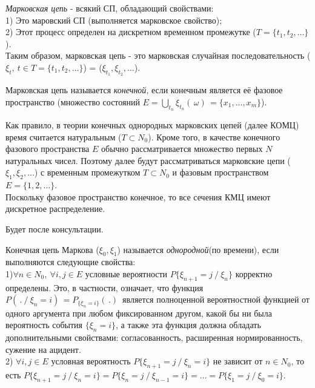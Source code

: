 \begin{defs}
  \textit{Марковская цепь} - всякий СП, обладающий свойствами:\\
  1) Это маровский СП (выполняется марковское свойство); \\
  2) Этот процесс определен на дискретном временном промежутке ($T = \{t_1, t_2, \ldots\}$).\\
  Таким образом, марковская цепь - это марковская случайная последовательность ($\xi_t, \ t \in T = \{t_1, t_2, \ldots\}$) =
  ($\xi_{t_1}, \xi_{t_2}, \ldots$).
\end{defs}

\begin{defs}
  Марковская цепь называется \textit{конечной}, если конечным является её фазовое пространство
  (множество состояний $E = \bigcup\limits_{t_n}\xi_{t_n}(\, \omega) \, = \{x_1, \ldots, x_m\}$).
\end{defs}

Как правило, в теории конечных однородных марковских цепей (далее КОМЦ) время считается натуральным
($T \subset N_0$). Кроме того, в качестве конечного фазового пространства $E$ обычно рассматривается множество первых $N$ натуральных чисел.
Поэтому далее будут рассматриваться марковские цепи ($\xi_1, \xi_2, \ldots$) с временным промежутком $T \subset N_0$ и фазовым
пространством $E = \{1, 2, \ldots\}$. \\

Поскольку фазовое пространство конечное, то все сечения КМЦ имеют дискретное распределение. \\

\begin{example}[]
  Будет после консультации.
\end{example}

\begin{defs}
  Конечная цепь Маркова ($\xi_0, \xi_1$) называется \textit{однородной}(по времени), если выполняются следующие свойства:\\
  1)$\forall n \in N_0, \ \forall i,j \in E$ условные вероятности $P\{\xi_{n+1}=j \ / \ \xi_n\}$ корректно определены.
  Это, в частности, означает, что функция $P( \,. \ / \ \xi_n=i) \, = P_{\{\xi_n=i\}}( \,.) \,$ является полноценной
  вероятностной функцией от одного аргумента при любом фиксированном другом, какой бы ни была вероятность события $\{\xi_n=i\}$, а
  также эта функция должна обладать дополнительными свойствами: согласованность, расширенная нормированность, сужение на ацидент. \\
  2) $\forall i,j \in E$ условная вероятность $P\{\xi_{n+1}=j \ / \ \xi_n=i\}$ не зависит от $n \in N_0$, то есть
  $P\{\xi_{n+1}=j \ / \ \xi_n=i\} = P\{\xi_{n}=j \ / \ \xi_{n-1}=i\} = \ldots = P\{\xi_1=j \ / \ \xi_0=i\}$.
\end{defs}

